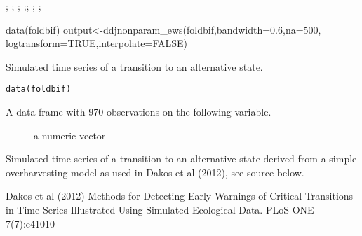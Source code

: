 \documentclass[a4paper]{book}
\begin{document}
%
\begin{SeeAlso}\relax
{}; ;
;
;;
; ;
\end{SeeAlso}
%
\begin{Examples}
\begin{ExampleCode}
data(foldbif)
output<-ddjnonparam_ews(foldbif,bandwidth=0.6,na=500,
logtransform=TRUE,interpolate=FALSE)
\end{ExampleCode}
\end{Examples}
%
\begin{Description}\relax
Simulated time series of a transition to an alternative state.

\end{Description}
%
\begin{Usage}
\begin{verbatim}
data(foldbif)
\end{verbatim}
\end{Usage}
%
\begin{Format}
A data frame with 970 observations on the following variable.
\begin{description}

\item[] a numeric vector

\end{description}

\end{Format}
%
\begin{Details}\relax
Simulated time series of a transition to an alternative state derived from a simple overharvesting model as used in Dakos et al (2012), see source below.

\end{Details}
%
\begin{Source}\relax
Dakos et al (2012) Methods for Detecting Early Warnings of Critical Transitions in Time Series Illustrated Using Simulated Ecological Data. PLoS ONE 7(7):e41010

\end{Source}
\end{document}
